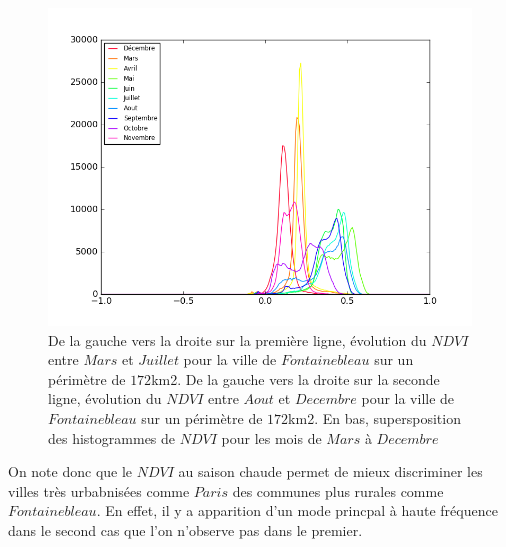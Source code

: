 \documentclass{book}
\begin{document}
\begin{figure}[H]
\begin{center}
\includegraphics[scale=0.45]{images/Fontainebleau/all_ndvi_histo.png}
\end{center}
\caption{De la gauche vers la droite sur la première ligne, évolution du $NDVI$ entre $Mars$ et $Juillet$ pour la ville de $Fontainebleau$ sur un périmètre de $172$km2.
De la gauche vers la droite sur la seconde ligne, évolution du $NDVI$ entre $Aout$ et $Decembre$ pour la ville de $Fontainebleau$ sur un périmètre de $172$km2. 
En bas, supersposition des histogrammes de $NDVI$ pour les mois de $Mars$ à $Decembre$}
\label{fontainebleau_ndvi_annee}
\end{figure}

On note donc que le $NDVI$ au saison chaude permet de mieux discriminer les villes très urbabnisées comme $Paris$ des communes plus rurales comme $Fontainebleau$. En effet, il y a apparition
d'un mode princpal à haute fréquence dans le second cas que l'on n'observe pas dans le premier.
\clearpage

\backmatter

\listoftables

\listoffigures



\end{document}
